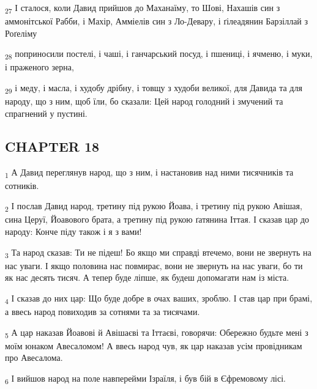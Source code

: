 \begin{tcolorbox}
\textsubscript{27} І сталося, коли Давид прийшов до Маханаїму, то Шові, Нахашів син з аммонітської Рабби, і Махір, Амміелів син з Ло-Девару, і ґілеадянин Барзіллай з Роґеліму
\end{tcolorbox}
\begin{tcolorbox}
\textsubscript{28} поприносили постелі, і чаші, і ганчарський посуд, і пшениці, і ячменю, і муки, і праженого зерна,
\end{tcolorbox}
\begin{tcolorbox}
\textsubscript{29} і меду, і масла, і худобу дрібну, і товщу з худоби великої, для Давида та для народу, що з ним, щоб їли, бо сказали: Цей народ голодний і змучений та спрагнений у пустині.
\end{tcolorbox}
\subsection{CHAPTER 18}
\begin{tcolorbox}
\textsubscript{1} А Давид переглянув народ, що з ним, і настановив над ними тисячників та сотників.
\end{tcolorbox}
\begin{tcolorbox}
\textsubscript{2} І послав Давид народ, третину під рукою Йоава, і третину під рукою Авішая, сина Церуї, Йоавового брата, а третину під рукою ґатянина Іттая. І сказав цар до народу: Конче піду також і я з вами!
\end{tcolorbox}
\begin{tcolorbox}
\textsubscript{3} Та народ сказав: Ти не підеш! Бо якщо ми справді втечемо, вони не звернуть на нас уваги. І якщо половина нас повмирає, вони не звернуть на нас уваги, бо ти як нас десять тисяч. А тепер буде ліпше, як будеш допомагати нам із міста.
\end{tcolorbox}
\begin{tcolorbox}
\textsubscript{4} І сказав до них цар: Що буде добре в очах ваших, зроблю. І став цар при брамі, а ввесь народ повиходив за сотнями та за тисячами.
\end{tcolorbox}
\begin{tcolorbox}
\textsubscript{5} А цар наказав Йоавові й Авішаєві та Іттаєві, говорячи: Обережно будьте мені з моїм юнаком Авесаломом! А ввесь народ чув, як цар наказав усім провідникам про Авесалома.
\end{tcolorbox}
\begin{tcolorbox}
\textsubscript{6} І вийшов народ на поле навперейми Ізраїля, і був бій в Єфремовому лісі.
\end{tcolorbox}
